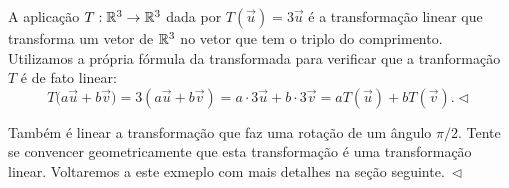 \documentclass[../livro.tex]{subfiles}
\begin{document}
\begin{example}
A aplicação $T: \mathbb{R}^3 \to \mathbb{R}^3$ dada por $T(\vec{u}) = 3\vec{u}$ é a transformação linear que transforma um vetor de $\mathbb{R}^3$ no vetor que tem o triplo do comprimento. Utilizamos a própria fórmula da transformada para verificar que a tranformação $T$ é de fato linear:
\begin{equation}
T\big( a \vec{u} + b \vec{v} \big) = 3 ( a \vec{u} + b \vec{v} ) = a \cdot 3 \vec{u} + b \cdot 3 \vec{v} = aT(\vec{u}) + bT(\vec{v}). \lhd
\end{equation}
\end{example}


\begin{example}\label{exp:4}
Também é linear a transformação que faz uma rotação de um ângulo $\pi / 2$. Tente se convencer geometricamente que esta transformação é uma transformação linear. Voltaremos a este exmeplo com mais detalhes na seção seguinte$. \ \lhd$
\end{example}
\end{document}
